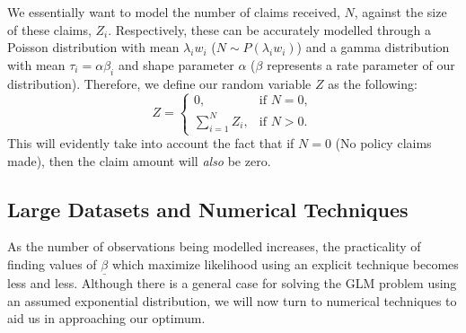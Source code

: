 \documentclass{article}
\begin{document}
We essentially want to model the number of claims received, $N$, against the size of these claims, $Z_i$. Respectively, these can be accurately modelled through a Poisson distribution with mean $\lambda_i w_i$ ($N\sim P(\lambda_i w_i)$) and a gamma distribution with mean $\tau_i = \alpha\beta_i$ and shape parameter $\alpha$ ($\beta$ represents a rate parameter of our distribution). Therefore, we define our random variable $Z$ as the following:
\begin{equation}
    Z = \left\{ \begin{matrix} 0, & \text{if }N = 0, \\ \sum_{i=1}^N Z_i, & \text{if }N>0. \end{matrix}\right.
\end{equation}
This will evidently take into account the fact that if $N=0$ (No policy claims made), then the claim amount will \textit{also} be zero.

\subsection{Large Datasets and Numerical Techniques}
As the number of observations being modelled increases, the practicality of finding values of $\underline{\beta}$ which maximize likelihood using an explicit technique becomes less and less. Although there is a general case for solving the GLM problem using an assumed exponential distribution, we will now turn to numerical techniques to aid us in approaching our optimum.

\nocite{2008APG}
\nocite{géron2019hands}
\nocite{GLM_basics}
\printbibliography
\end{document}
